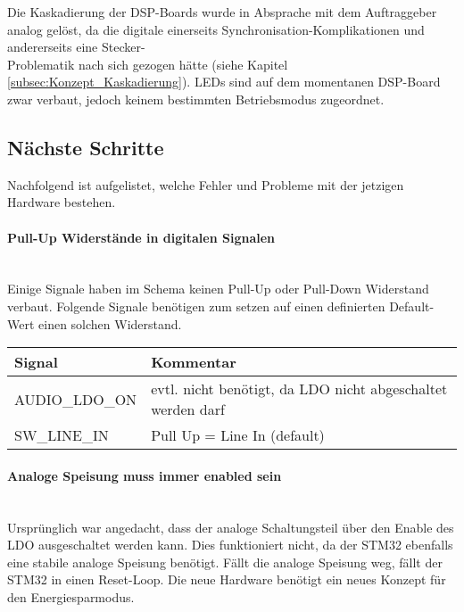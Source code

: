 Die Kaskadierung der DSP-Boards wurde in Absprache mit dem Auftraggeber analog gelöst, da die digitale einerseits Synchronisation-Komplikationen und andererseits eine Stecker-\\Problematik nach sich gezogen hätte (siehe Kapitel \ref{subsec:Konzept_Kaskadierung}). LEDs sind auf dem momentanen DSP-Board zwar verbaut, jedoch keinem bestimmten Betriebsmodus zugeordnet.

\clearpage

\subsection{Nächste Schritte}

Nachfolgend ist aufgelistet, welche Fehler und Probleme mit der jetzigen Hardware bestehen.
\\
\paragraph{Pull-Up Widerstände in digitalen Signalen}\vspace{-0.3cm}\\
Einige Signale haben im Schema keinen Pull-Up oder Pull-Down Widerstand verbaut.
Folgende Signale benötigen zum setzen auf einen definierten Default-Wert einen solchen Widerstand.
\begin{table}[H]
	\centering
	\begin{tabular}{|l|l|}
		\hline
		\textbf{Signal} & \textbf{Kommentar}                                          \\ \hline
		AUDIO\_LDO\_ON  & evtl. nicht benötigt, da LDO nicht abgeschaltet werden darf \\ \hline
		SW\_LINE\_IN    & Pull Up = Line In (default)                                 \\ \hline
	\end{tabular}
\end{table}

\paragraph{Analoge Speisung muss immer enabled sein}\vspace{-0.3cm}\\
Ursprünglich war angedacht, dass der analoge Schaltungsteil über den Enable des LDO ausgeschaltet werden kann. Dies funktioniert nicht, da der STM32 ebenfalls eine stabile analoge Speisung benötigt. Fällt die analoge Speisung weg, fällt der STM32 in einen Reset-Loop.
Die neue Hardware benötigt ein neues Konzept für den Energiesparmodus.
\\
